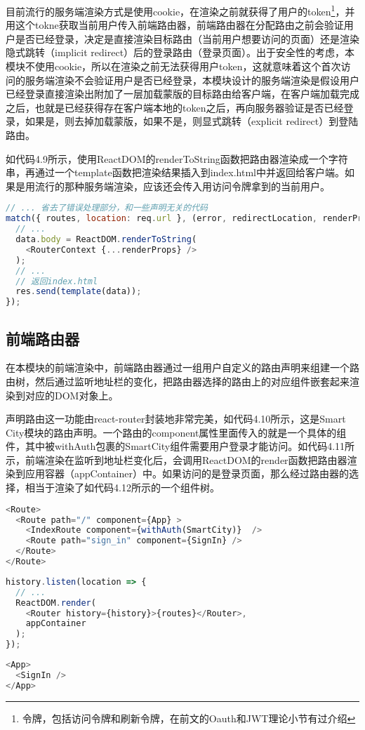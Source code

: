 目前流行的服务端渲染方式是使用cookie，在渲染之前就获得了用户的token\footnote{令牌，包括访问令牌和刷新令牌，在前文的Oauth和JWT理论小节有过介绍}，并用这个tokne获取当前用户传入前端路由器，前端路由器在分配路由之前会验证用户是否已经登录，决定是直接渲染目标路由（当前用户想要访问的页面）还是渲染隐式跳转（implicit redirect）后的登录路由（登录页面）。出于安全性的考虑，本模块不使用cookie，所以在渲染之前无法获得用户token，这就意味着这个首次访问的服务端渲染不会验证用户是否已经登录，本模块设计的服务端渲染是假设用户已经登录直接渲染出附加了一层加载蒙版的目标路由给客户端，在客户端加载完成之后，也就是已经获得存在客户端本地的token之后，再向服务器验证是否已经登录，如果是，则去掉加载蒙版，如果不是，则显式跳转（explicit redirect）到登陆路由。

如代码4.9所示，使用ReactDOM的renderToString函数把路由器渲染成一个字符串，再通过一个template函数把渲染结果插入到index.html中并返回给客户端。如果是用流行的那种服务端渲染，应该还会传入用访问令牌拿到的当前用户。
\begin{lstlisting}[language={JavaScript}, caption={服务端渲染样例代码}]
// ... 省去了错误处理部分，和一些声明无关的代码
match({ routes, location: req.url }, (error, redirectLocation, renderProps) => {
  // ...
  data.body = ReactDOM.renderToString(
    <RouterContext {...renderProps} />
  );
  // ...
  // 返回index.html
  res.send(template(data));
});
\end{lstlisting}

\subsection{前端路由器}
在本模块的前端渲染中，前端路由器通过一组用户自定义的路由声明来组建一个路由树，然后通过监听地址栏的变化，把路由器选择的路由上的对应组件嵌套起来渲染到对应的DOM对象上。

声明路由这一功能由react-router封装地非常完美，如代码4.10所示，这是Smart City模块的路由声明。一个路由的component属性里面传入的就是一个具体的组件，其中被withAuth包裹的SmartCity组件需要用户登录才能访问。如代码4.11所示，前端渲染在监听到地址栏变化后，会调用ReactDOM的render函数把路由器渲染到应用容器（appContainer）中。如果访问的是登录页面，那么经过路由器的选择，相当于渲染了如代码4.12所示的一个组件树。
\begin{lstlisting}[language={JavaScript}, caption={Smart City路由声明}]
<Route>
  <Route path="/" component={App} >
    <IndexRoute component={withAuth(SmartCity)}  />
    <Route path="sign_in" component={SignIn} />
  </Route>
</Route>
\end{lstlisting}
\begin{lstlisting}[language={JavaScript}, caption={Smart City前端渲染}]
history.listen(location => {
  // ...
  ReactDOM.render(
    <Router history={history}>{routes}</Router>,
    appContainer
  );
});
\end{lstlisting}
\begin{lstlisting}[language={JavaScript}, caption={Smart City登录页面实际渲染的组件树}]
<App>
  <SignIn />
</App>
\end{lstlisting}

